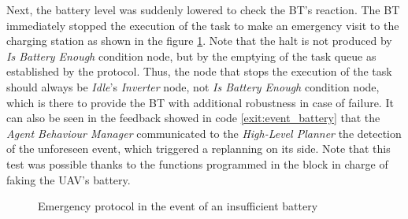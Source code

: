 Next, the battery level was suddenly lowered to check the \gls{BT}'s reaction. The \gls{BT} immediately stopped the execution of the task to make an emergency visit to the charging station as shown in the figure \ref{fig:event_battery}. Note that the halt is not produced by \emph{Is Battery Enough} condition node, but by the emptying of the task queue as established by the protocol. Thus, the node that stops the execution of the task should always be \emph{Idle}'s \emph{Inverter} node, not \emph{Is Battery Enough} condition node, which is there to provide the \gls{BT} with additional robustness in case of failure. It can also be seen in the feedback showed in code \ref{exit:event_battery} that the \emph{Agent Behaviour Manager} communicated to the \emph{High-Level Planner} the detection of the unforeseen event, which triggered a replanning on its side. Note that this test was possible thanks to the functions programmed in the block in charge of faking the \gls{UAV}'s battery.

\begin{figure}[htbp]
    \centering
    \hfill
    \hfill
    \caption{Emergency protocol in the event of an insufficient battery}
    \label{fig:event_battery}
\end{figure}

